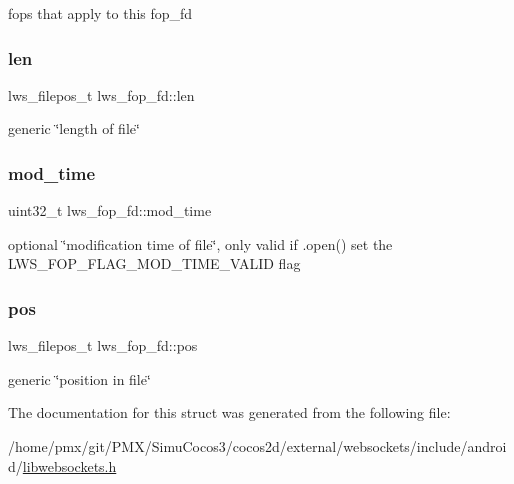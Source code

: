 fops that apply to this fop\+\_\+fd \mbox{\label{structlws__fop__fd_aba3e39c1818d8a221efddddb98e884c4}} 
\subsubsection{\texorpdfstring{len}{len}}
{\footnotesize\ttfamily lws\+\_\+filepos\+\_\+t lws\+\_\+fop\+\_\+fd\+::len}

generic \char`\"{}length of file\char`\"{} \mbox{\label{structlws__fop__fd_aa2f6af8b19612dafd51f24b855c71ba5}} 
\subsubsection{\texorpdfstring{mod\+\_\+time}{mod\_time}}
{\footnotesize\ttfamily uint32\+\_\+t lws\+\_\+fop\+\_\+fd\+::mod\+\_\+time}

optional \char`\"{}modification time of file\char`\"{}, only valid if .open() set the L\+W\+S\+\_\+\+F\+O\+P\+\_\+\+F\+L\+A\+G\+\_\+\+M\+O\+D\+\_\+\+T\+I\+M\+E\+\_\+\+V\+A\+L\+ID flag \mbox{\label{structlws__fop__fd_a161e1dc7bff7120ab71198fd24942703}} 
\subsubsection{\texorpdfstring{pos}{pos}}
{\footnotesize\ttfamily lws\+\_\+filepos\+\_\+t lws\+\_\+fop\+\_\+fd\+::pos}

generic \char`\"{}position in file\char`\"{} 

The documentation for this struct was generated from the following file\+:\begin{DoxyCompactItemize}
\item 
/home/pmx/git/\+P\+M\+X/\+Simu\+Cocos3/cocos2d/external/websockets/include/android/\hyperlink{_2cocos2d_2external_2websockets_2include_2android_2libwebsockets_8h}{libwebsockets.\+h}\end{DoxyCompactItemize}
